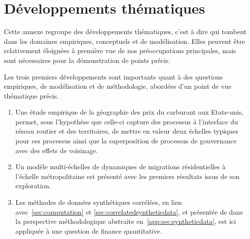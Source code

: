 



\newpage

\chapter{Développements thématiques}


\label{app:thematic} %



Cette annexe regroupe des développements thématiques, c'est à dire qui tombent dans les domaines empiriques, conceptuels et de modélisation. Elles peuvent être relativement éloignées à première vue de nos préoccupations principales, mais sont nécessaires pour la démonstration de points précis.


Les trois premiers développements sont importants quant à des questions empiriques, de modélisation et de méthodologie, abordées d'un point de vue thématique précis.
\begin{enumerate}
	\item Une étude empirique de la géographie des prix du carburant aux Etats-unis, permet, sous l'hypothèse que celle-ci capture des processus à l'interface du réseau routier et des territoires, de mettre en valeur deux échelles typiques pour ces processus ainsi que la superposition de processus de gouvernance avec des effets de voisinage.
	\item Un modèle multi-échelles de dynamiques de migrations résidentielles à l'échelle métropolitaine est présenté avec les premiers résultats issus de son exploration.
	\item Les méthodes de données synthétiques corrélées, en lien avec~\ref{sec:computation} et \ref{sec:correlatedsyntheticdata}, et présentée de dans la perspective méthodologique abstraite en~\ref{app:sec:syntheticdata}, est ici appliquée à une question de finance quantitative.
\end{enumerate}



